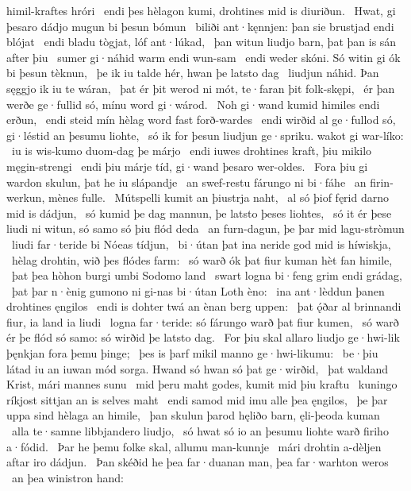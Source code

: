 himil-kraftes hróri \hld\ endi þes hèlagon kumi,
drohtines mid is diuriðun. \hld\ Hwat, gi þesaro dádjo mugun
bi þesun bómun \hld\ biliði ant·kęnnjen:
þan sie brustjad endi blójat \hld\ endi bladu tògjat,
lóf ant·lúkad, \hld\ þan witun liudjo barn,
þat þan is sán after þiu \hld\ sumer gi·náhid
warm endi wun-sam \hld\ endi weder skóni.
Só witin gi ók bi þesun tèknun, \hld\ þe ik iu talde hér,
hwan þe latsto dag \hld\ liudjun náhid.
Þan sęggjo ik iu te wáran, \hld\ þat ér þit werod ni mót,
te·faran þit folk-skępi, \hld\ ér þan werðe ge·fullid só,
mínu word gi·wárod. \hld\ Noh gi·wand kumid
himiles endi erðun, \hld\ endi steid mín hèlag word
fast forð-wardes \hld\ endi wirðid al ge·fullod só,
gi·léstid an þesumu liohte, \hld\ só ik for þesun liudjun ge·spriku.
wakot gi war-líko: \hld\ iu is wis-kumo
duom-dag þe márjo \hld\ endi iuwes drohtines kraft,
þiu mikilo męgin-strengi \hld\ endi þiu márje tíd,
gi·wand þesaro wer-oldes. \hld\ Fora þiu gi wardon skulun,
þat he iu slápandje \hld\ an swef-restu
fárungo ni bi·fáhe \hld\ an firin-werkun,
mènes fulle. \hld\ Mútspelli kumit
an þiustrja naht, \hld\ al só þiof fęrid
darno mid is dádjun, \hld\ só kumid þe dag mannun,
þe latsto þeses liohtes, \hld\ só it ér þese liudi ni witun,
só samo só þiu flód deda \hld\ an furn-dagun,
þe þar mid lagu-stròmun \hld\ liudi far·teride
bi Nóeas tídjun, \hld\ bi·útan þat ina neride god
mid is híwiskja, \hld\ hèlag drohtin,
wið þes flódes farm: \hld\ só warð ók þat fiur kuman
hèt fan himile, \hld\ þat þea hòhon burgi
umbi Sodomo land \hld\ swart logna bi·feng
grim endi grádag, \hld\ þat þar n·ènig gumono ni gi-nas
bi·útan Loth èno: \hld\ ina ant·lèddun þanen
drohtines ęngilos \hld\ endi is dohter twá
an ènan berg uppen: \hld\ þat ǫ́ðar al brinnandi fiur,
ia land ia liudi \hld\ logna far·teride:
só fárungo warð þat fiur kumen, \hld\ só warð ér þe flód só samo:
só wirðid þe latsto dag. \hld\ For þiu skal allaro liudjo ge·hwi-lik
þęnkjan fora þemu þinge; \hld\ þes is þarf mikil
manno ge·hwi-likumu: \hld\ be·þiu látad iu an iuwan mód sorga.
Hwand só hwan só þat ge·wirðid, \hld\ þat waldand Krist,
mári mannes sunu \hld\ mid þeru maht godes,
kumit mid þiu kraftu \hld\ kuningo ríkjost
sittjan an is selves maht \hld\ endi samod mid imu
alle þea ęngilos, \hld\ þe þar uppa sind
hèlaga an himile, \hld\ þan skulun þarod hęliðo barn,
ęli-þeoda kuman \hld\ alla te·samne
libbjandero liudjo, \hld\ só hwat só io an þesumu liohte warð
firiho a·fódid. \hld\ Þar he þemu folke skal,
allumu man-kunnje \hld\ mári drohtin
a-dèljen aftar iro dádjun. \hld\ Þan skéðid he þea far·duanan man,
þea far·warhton weros \hld\ an þea winistron hand:
